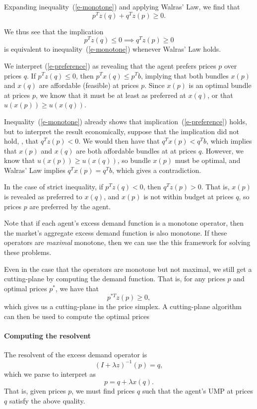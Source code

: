 \documentclass{article}
\begin{document}
Expanding inequality~(\ref{e-monotone}) and applying Walras' Law, we find that
\[
p^T z(q) + q^T z(p) \geq 0.
\]

We thus see that the implication
\begin{equation}
\label{e-preference}
p^T z(q) \leq 0 \implies q^T z(p) \geq 0
\end{equation}
is equivalent  to inequality~(\ref{e-monotone}) whenever Walras' Law holds.

We interpret (\ref{e-preference}) as revealing that the agent prefers prices
$p$ over prices $q$. If $p^T z(q) \leq 0$, then $p^T x(q) \leq p^T b$, implying
that both bundles $x(p)$ and $x(q)$ are affordable (feasible) at prices $p$.
Since $x(p)$ is an optimal bundle at prices $p$, we know that it must be at least
as preferred at $x(q)$, or that $u(x(p)) \geq u(x(q))$.

Inequality~(\ref{e-monotone}) already shows that implication~(\ref{e-preference})
holds, but to interpret the result economically, suppose that the
implication did not hold, \ie, that $q^T z(p) < 0$. We would then have that
$q^T x(p) < q^T b$, which implies that $x(p)$ and $x(q)$ are both affordable
bundles at at prices $q$. However, we know that $u(x(p)) \geq u(x(q))$, so
bundle $x(p)$ must be optimal, and Walras' Law implies $q^T x(p) = q^T b$, which
gives a contradiction. 

In the case of strict inequality, if $p^T z(q) < 0$, then $q^T z(p) > 0$.
That is, $x(p)$ is revealed as preferred to $x(q)$, and $x(p)$ is not within
budget at prices $q$, so prices $p$ are preferred by the agent.

Note that if each agent's excess demand function is a monotone operator, then
the market's aggregate excess demand function is also monotone. If these
operators are \emph{maximal} monotone, then we can use the this framework for
solving these problems. 

Even in the case that the operators are monotone but not maximal, we still get
a cutting-plane by computing the demand function. That is, for any prices $p$
and optimal prices $p^*$, we have that
\[
p^{*T} z(p) \geq 0,
\]
which gives us a cutting-plane in the price simplex.
A cutting-plane algorithm can then be used to compute the optimal prices

\paragraph{Computing the resolvent}
The resolvent of the excess demand operator is
\[
(I + \lambda z)^{-1}(p) = q,
\]
which we parse to interpret as
\[
p = q + \lambda x(q).
\]
That is, given prices $p$, we must find prices $q$ such that the agent's UMP
at prices $q$ satisfy the above quality.
\end{document}
